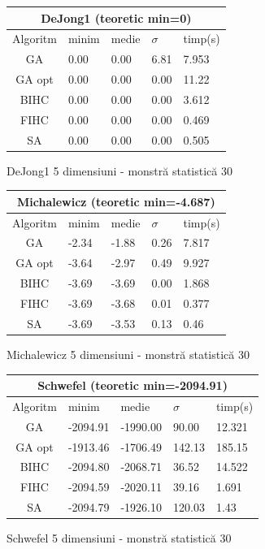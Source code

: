 \documentclass{article}
\begin{document}
\begin{figure}[!h]
\begin{tabular}{||c|||l|l|l|l||}
  \hline
  \multicolumn{5}{||c||}{DeJong1 (teoretic min=0)} \\ \hline
  Algoritm & minim & medie & $\sigma$ & timp(s) \\ \hline \hline
  GA & 0.00 & 0.00 & 6.81 & 7.953 \\ \hline
  GA opt & 0.00 & 0.00 & 0.00 & 11.22 \\ \hline
  BIHC & 0.00 & 0.00 & 0.00 & 3.612\\ \hline
  FIHC & 0.00 & 0.00 & 0.00 & 0.469 \\ \hline
  SA & 0.00 & 0.00 & 0.00 & 0.505 \\ \hline
\end{tabular}
\caption{DeJong1 5 dimensiuni - monstră statistică 30} 
\end{figure}
\clearpage
\begin{figure}[!h]
\begin{tabular}{||c|||l|l|l|l||}
  \hline
  \multicolumn{5}{||c||}{Michalewicz (teoretic min=-4.687)} \\ \hline
  Algoritm & minim & medie & $\sigma$ & timp(s) \\ \hline \hline
  GA & -2.34 & -1.88 & 0.26 & 7.817 \\ \hline
  GA opt & -3.64 & -2.97 & 0.49 & 9.927 \\ \hline
  BIHC & -3.69 & -3.69 & 0.00 & 1.868\\ \hline
  FIHC & -3.69 & -3.68 & 0.01 & 0.377 \\ \hline
  SA & -3.69 & -3.53 & 0.13 & 0.46 \\ \hline
\end{tabular}
\caption{Michalewicz 5 dimensiuni - monstră statistică 30} 
\end{figure}

\begin{figure}[!h]
\begin{tabular}{||c|||l|l|l|l||}
  \hline
  \multicolumn{5}{||c||}{Schwefel (teoretic min=-2094.91)} \\ \hline
  Algoritm & minim & medie & $\sigma$ & timp(s) \\ \hline \hline
  GA & -2094.91 & -1990.00 & 90.00 & 12.321\\ \hline
  GA opt & -1913.46 & -1706.49 & 142.13 & 185.15 \\ \hline
  BIHC & -2094.80 & -2068.71 & 36.52 & 14.522\\ \hline
  FIHC & -2094.59 & -2020.11 & 39.16 & 1.691 \\ \hline
  SA & -2094.79 & -1926.10 & 120.03 & 1.43 \\ \hline
\end{tabular}
\caption{Schwefel 5 dimensiuni - monstră statistică 30} 
\end{figure}
\end{document}
